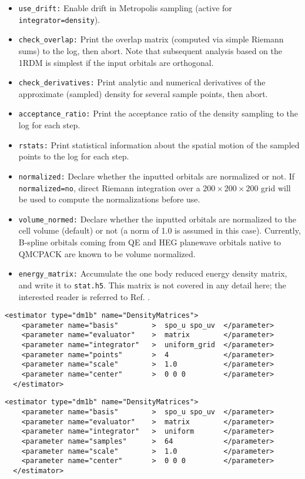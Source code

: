 \begin{itemize}
  \item{\texttt{use\_drift:} Enable drift in Metropolis sampling  (active for \texttt{integrator=density}).}
  \item{\texttt{check\_overlap:} Print the overlap matrix (computed via simple Riemann sums) to the log, then abort.  Note that subsequent analysis based on the 1RDM is simplest if the input orbitals are orthogonal.}
  \item{\texttt{check\_derivatives:} Print analytic and numerical derivatives of the approximate (sampled) density for several sample points, then abort. }
  \item{\texttt{acceptance\_ratio:} Print the acceptance ratio of the density sampling to the log for each step.}
  \item{\texttt{rstats:} Print statistical information about the spatial motion of the sampled points to the log for each step.}
  \item{\texttt{normalized:} Declare whether the inputted orbitals are normalized or not.  If \texttt{normalized=no}, direct Riemann integration over a $200 \times 200 \times 200$ grid will be used to compute the normalizations before use.}
  \item{\texttt{volume\_normed:} Declare whether the inputted orbitals are normalized to the cell volume (default) or not (a norm of 1.0 is assumed in this case).  Currently, B-spline orbitals coming from QE and HEG planewave orbitals native to QMCPACK are known to be volume normalized.}
  \item{\texttt{energy\_matrix:} Accumulate the one body reduced energy density matrix, and write it to \texttt{stat.h5}.  This matrix is not covered in any detail here; the interested reader is referred to Ref. \cite{Krogel2014}.}
\end{itemize}


\begin{lstlisting}[style=QMCPXML,caption=One body density matrix with uniform grid integration.]
  <estimator type="dm1b" name="DensityMatrices">
    <parameter name="basis"        >  spo_u spo_uv  </parameter>
    <parameter name="evaluator"    >  matrix        </parameter>
    <parameter name="integrator"   >  uniform_grid  </parameter>
    <parameter name="points"       >  4             </parameter>
    <parameter name="scale"        >  1.0           </parameter>
    <parameter name="center"       >  0 0 0         </parameter>
  </estimator>
\end{lstlisting}


\begin{lstlisting}[style=QMCPXML,caption=One body density matrix with uniform sampling.]
  <estimator type="dm1b" name="DensityMatrices">
    <parameter name="basis"        >  spo_u spo_uv  </parameter>
    <parameter name="evaluator"    >  matrix        </parameter>
    <parameter name="integrator"   >  uniform       </parameter>
    <parameter name="samples"      >  64            </parameter>
    <parameter name="scale"        >  1.0           </parameter>
    <parameter name="center"       >  0 0 0         </parameter>
  </estimator>
\end{lstlisting}


